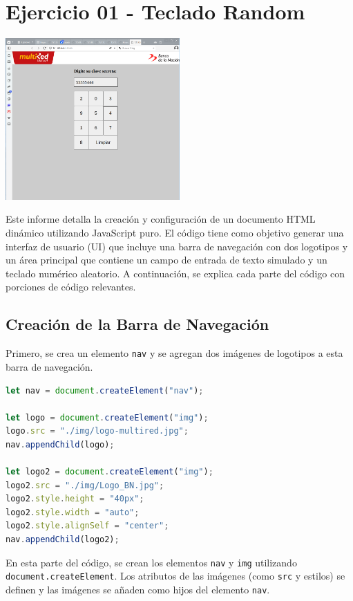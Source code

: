 \section*{Ejercicio 01 - Teclado Random}

\includegraphics[width=0.5\textwidth]{./img/ejercicio01.png}

Este informe detalla la creación y configuración de un documento HTML dinámico utilizando JavaScript puro. El código tiene como objetivo generar una interfaz de usuario (UI) que incluye una barra de navegación con dos logotipos y un área principal que contiene un campo de entrada de texto simulado y un teclado numérico aleatorio. A continuación, se explica cada parte del código con porciones de código relevantes.

\subsection*{Creación de la Barra de Navegación}

Primero, se crea un elemento \texttt{nav} y se agregan dos imágenes de logotipos a esta barra de navegación.

\begin{lstlisting}[language=JavaScript]
let nav = document.createElement("nav");

let logo = document.createElement("img");
logo.src = "./img/logo-multired.jpg";
nav.appendChild(logo);

let logo2 = document.createElement("img");
logo2.src = "./img/Logo_BN.jpg";
logo2.style.height = "40px";
logo2.style.width = "auto";
logo2.style.alignSelf = "center";
nav.appendChild(logo2);
\end{lstlisting}

En esta parte del código, se crean los elementos \texttt{nav} y \texttt{img} utilizando \texttt{document.createElement}. Los atributos de las imágenes (como \texttt{src} y estilos) se definen y las imágenes se añaden como hijos del elemento \texttt{nav}.


